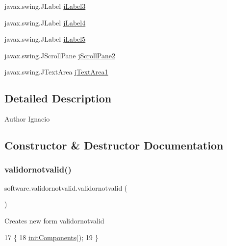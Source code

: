 \begin{DoxyCompactItemize}
\item 
javax.\+swing.\+J\+Label \mbox{\hyperlink{classsoftware_1_1validornotvalid_a7b2e42b02447e6b29b0c4626ee773c0d}{j\+Label3}}
\item 
javax.\+swing.\+J\+Label \mbox{\hyperlink{classsoftware_1_1validornotvalid_a8e62567b7da0a8b4c83016569d52963e}{j\+Label4}}
\item 
javax.\+swing.\+J\+Label \mbox{\hyperlink{classsoftware_1_1validornotvalid_a4759a0841dcab0fa20a6e40de41546d0}{j\+Label5}}
\item 
javax.\+swing.\+J\+Scroll\+Pane \mbox{\hyperlink{classsoftware_1_1validornotvalid_afbe433c154dcca4c8d5a9c0714485d8e}{j\+Scroll\+Pane2}}
\item 
javax.\+swing.\+J\+Text\+Area \mbox{\hyperlink{classsoftware_1_1validornotvalid_aadacd01c76d614784cee0866af75c36c}{j\+Text\+Area1}}
\end{DoxyCompactItemize}


\subsection{Detailed Description}
\begin{DoxyAuthor}{Author}
Ignacio 
\end{DoxyAuthor}


\subsection{Constructor \& Destructor Documentation}
\mbox{\label{classsoftware_1_1validornotvalid_af537676fcb9f27ef30b7c7375f4f46f9}} 
\subsubsection{\texorpdfstring{validornotvalid()}{validornotvalid()}}
{\footnotesize\ttfamily software.\+validornotvalid.\+validornotvalid (\begin{DoxyParamCaption}{ }\end{DoxyParamCaption})\hspace{0.3cm}{\ttfamily [inline]}}

Creates new form validornotvalid 
\begin{DoxyCode}
17                              \{
18         \mbox{\hyperlink{classsoftware_1_1validornotvalid_a4ee4101bb8596e95283aafd09e54fef5}{initComponents}}();
19     \}
\end{DoxyCode}


